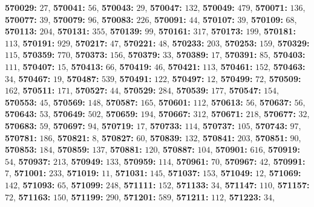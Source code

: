 \textsf{\bfseries 570029:} $27$, \textsf{\bfseries 570041:} $56$, \textsf{\bfseries 570043:} $29$, \textsf{\bfseries 570047:} $132$, \textsf{\bfseries 570049:} $479$, \textsf{\bfseries 570071:} $136$, \textsf{\bfseries 570077:} $39$, \textsf{\bfseries 570079:} $96$, \textsf{\bfseries 570083:} $226$, \textsf{\bfseries 570091:} $44$, \textsf{\bfseries 570107:} $39$, \textsf{\bfseries 570109:} $68$, \textsf{\bfseries 570113:} $204$, \textsf{\bfseries 570131:} $355$, \textsf{\bfseries 570139:} $99$, \textsf{\bfseries 570161:} $317$, \textsf{\bfseries 570173:} $199$, \textsf{\bfseries 570181:} $113$, \textsf{\bfseries 570191:} $929$, \textsf{\bfseries 570217:} $47$, \textsf{\bfseries 570221:} $48$, \textsf{\bfseries 570233:} $203$, \textsf{\bfseries 570253:} $159$, \textsf{\bfseries 570329:} $115$, \textsf{\bfseries 570359:} $770$, \textsf{\bfseries 570373:} $156$, \textsf{\bfseries 570379:} $33$, \textsf{\bfseries 570389:} $17$, \textsf{\bfseries 570391:} $85$, \textsf{\bfseries 570403:} $111$, \textsf{\bfseries 570407:} $15$, \textsf{\bfseries 570413:} $66$, \textsf{\bfseries 570419:} $46$, \textsf{\bfseries 570421:} $113$, \textsf{\bfseries 570461:} $152$, \textsf{\bfseries 570463:} $34$, \textsf{\bfseries 570467:} $19$, \textsf{\bfseries 570487:} $539$, \textsf{\bfseries 570491:} $122$, \textsf{\bfseries 570497:} $12$, \textsf{\bfseries 570499:} $72$, \textsf{\bfseries 570509:} $162$, \textsf{\bfseries 570511:} $171$, \textsf{\bfseries 570527:} $44$, \textsf{\bfseries 570529:} $284$, \textsf{\bfseries 570539:} $177$, \textsf{\bfseries 570547:} $154$, \textsf{\bfseries 570553:} $45$, \textsf{\bfseries 570569:} $148$, \textsf{\bfseries 570587:} $165$, \textsf{\bfseries 570601:} $112$, \textsf{\bfseries 570613:} $56$, \textsf{\bfseries 570637:} $56$, \textsf{\bfseries 570643:} $53$, \textsf{\bfseries 570649:} $502$, \textsf{\bfseries 570659:} $194$, \textsf{\bfseries 570667:} $312$, \textsf{\bfseries 570671:} $218$, \textsf{\bfseries 570677:} $32$, \textsf{\bfseries 570683:} $59$, \textsf{\bfseries 570697:} $94$, \textsf{\bfseries 570719:} $17$, \textsf{\bfseries 570733:} $114$, \textsf{\bfseries 570737:} $105$, \textsf{\bfseries 570743:} $97$, \textsf{\bfseries 570781:} $186$, \textsf{\bfseries 570821:} $8$, \textsf{\bfseries 570827:} $60$, \textsf{\bfseries 570839:} $132$, \textsf{\bfseries 570841:} $203$, \textsf{\bfseries 570851:} $90$, \textsf{\bfseries 570853:} $184$, \textsf{\bfseries 570859:} $137$, \textsf{\bfseries 570881:} $120$, \textsf{\bfseries 570887:} $104$, \textsf{\bfseries 570901:} $616$, \textsf{\bfseries 570919:} $54$, \textsf{\bfseries 570937:} $213$, \textsf{\bfseries 570949:} $133$, \textsf{\bfseries 570959:} $114$, \textsf{\bfseries 570961:} $70$, \textsf{\bfseries 570967:} $42$, \textsf{\bfseries 570991:} $7$, \textsf{\bfseries 571001:} $233$, \textsf{\bfseries 571019:} $11$, \textsf{\bfseries 571031:} $145$, \textsf{\bfseries 571037:} $153$, \textsf{\bfseries 571049:} $12$, \textsf{\bfseries 571069:} $142$, \textsf{\bfseries 571093:} $65$, \textsf{\bfseries 571099:} $248$, \textsf{\bfseries 571111:} $152$, \textsf{\bfseries 571133:} $34$, \textsf{\bfseries 571147:} $110$, \textsf{\bfseries 571157:} $72$, \textsf{\bfseries 571163:} $150$, \textsf{\bfseries 571199:} $290$, \textsf{\bfseries 571201:} $589$, \textsf{\bfseries 571211:} $112$, \textsf{\bfseries 571223:} $34$, 
